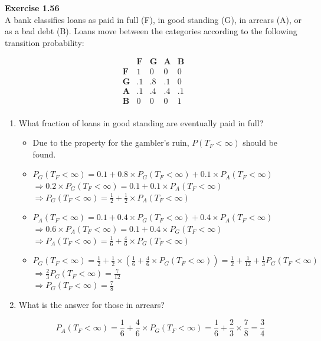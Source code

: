 \documentclass[12pt]{article}
\begin{document}
\newpage
\textbf{Exercise 1.56}\\
A bank classifies loans as paid in full (F), in good standing (G), in arrears
(A), or as a bad debt (B). Loans move between the categories according to the
following transition probability:

$$
\begin{matrix}
    &\textbf{F}&\textbf{G}&\textbf{A}&\textbf{B}\\
\textbf{F}&1&0&0&0\\
\textbf{G}&.1&.8&.1&0\\
\textbf{A}&.1&.4&.4&.1\\
\textbf{B}&0&0&0&1\\
\end{matrix}$$

\begin{enumerate}[label=(\alph*)]
\item What fraction of loans in good standing are eventually paid in full?
    \begin{itemize}
        \item Due to the property for the gambler's ruin, $P(T_F<\infty)$ should be found.
        
        \item $P_G(T_F<\infty) = 0.1 + 0.8\times P_G(T_F<\infty) + 0.1\times P_A(T_F<\infty)$\\
        $\Rightarrow 0.2\times P_G(T_F<\infty) = 0.1 + 0.1\times P_A(T_F<\infty)$\\
        $\Rightarrow P_G(T_F<\infty) = \frac{1}{2} + \frac{1}{2}\times P_A(T_F<\infty)$
        \vspace{1.5\baselineskip}
        
        \item $P_A(T_F<\infty) = 0.1 + 0.4\times P_G(T_F<\infty) + 0.4\times P_A(T_F<\infty)$\\
        $\Rightarrow 0.6\times P_A(T_F<\infty) = 0.1 + 0.4\times P_G(T_F<\infty)$\\
        $\Rightarrow P_A(T_F<\infty) = \frac{1}{6} + \frac{4}{6}\times P_G(T_F<\infty)$
        \vspace{1.5\baselineskip}
        
        \item $P_G(T_F<\infty) = \frac{1}{2} + \frac{1}{2} \times \left(\frac{1}{6} + \frac{4}{6}\times P_G(T_F<\infty)\right) =\frac{1}{2} + \frac{1}{12}+ \frac{1}{3}P_G(T_F<\infty)$\\ 
        $\Rightarrow \frac{2}{3} P_G(T_F<\infty) = \frac{7}{12}$\\
        $\Rightarrow P_G(T_F<\infty) = \frac{7}{8}$
        \vspace{1.5\baselineskip}
        
    \end{itemize}


\item What is the answer for those in arrears?
    
    $$P_A(T_F<\infty) = \frac{1}{6} + \frac{4}{6}\times P_G(T_F<\infty) = \frac{1}{6} + \frac{2}{3}\times \frac{7}{8} = \frac{3}{4}$$
    
\end{enumerate}
\end{document}
